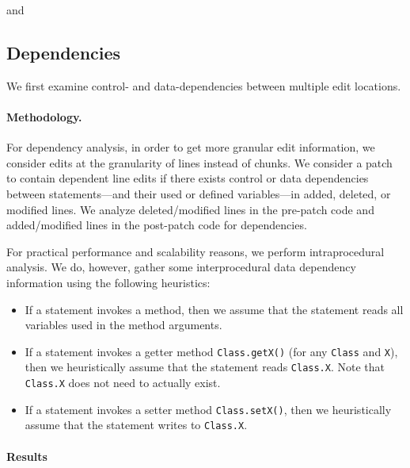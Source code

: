 \documentclass[sigconf, timestamp-false, anonymous=true]{acmart}
\begin{document}

and




\subsection{Dependencies}

We first examine control- and data-dependencies between multiple edit locations. 

\paragraph{Methodology.} For dependency analysis, 
in order to get more granular edit information,
we consider edits at the granularity of lines instead of chunks.
We consider a patch to contain dependent line edits if there exists 
control or data dependencies between statements---and their used or defined 
variables---in added, deleted, or modified lines. We analyze deleted/modified 
lines in the pre-patch code and added/modified lines in the post-patch code
for dependencies.
  
For practical performance and scalability reasons, 
we perform intraprocedural analysis. 
We do, however, gather some interprocedural data dependency information 
using the following heuristics:
\begin{itemize}
	\item If a statement invokes a method, then we assume that
	the statement reads all variables used in the method arguments.
	\item If a statement invokes a getter method \texttt{Class.getX()} 
	(for any \texttt{Class} and \texttt{X}), then we heuristically 
	assume that the statement reads \texttt{Class.X}. 
	Note that \texttt{Class.X} does not need to actually exist.
	\item If a statement invokes a setter method \texttt{Class.setX()}, 
	then we heuristically assume that the statement writes to \texttt{Class.X}. 
\end{itemize}

\paragraph{Results}
\end{document}
